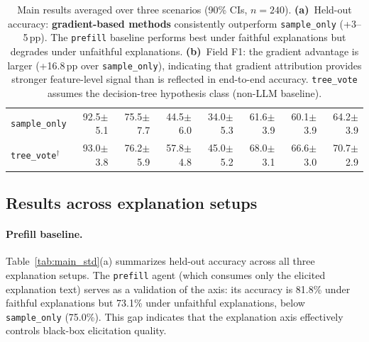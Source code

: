 \documentclass{article} %
\begin{document}
\begin{table}[t]
\begin{center}
\begin{tabular}{@{}l rrrr r | r | r@{}}
\texttt{sample\_only} & 92.5{\scriptsize$\pm$5.1} & 75.5{\scriptsize$\pm$7.7} & 44.5{\scriptsize$\pm$6.0} & 34.0{\scriptsize$\pm$5.3} & 61.6{\scriptsize$\pm$3.9} & 60.1{\scriptsize$\pm$3.9} & 64.2{\scriptsize$\pm$3.9} \\[2pt]
\texttt{tree\_vote}$^\dagger$ & 93.0{\scriptsize$\pm$3.8} & 76.2{\scriptsize$\pm$5.9} & 57.8{\scriptsize$\pm$4.8} & 45.0{\scriptsize$\pm$5.2} & 68.0{\scriptsize$\pm$3.1} & 66.6{\scriptsize$\pm$3.0} & 70.7{\scriptsize$\pm$2.9} \\
\bottomrule
\end{tabular}
\renewcommand{\arraystretch}{1.0}
\end{center}
\vspace{-0.1in}
\caption{Main results averaged over three scenarios (90\% CIs, $n{=}240$). \textbf{(a)}~Held-out accuracy: {\setlength{\fboxsep}{1pt}\colorbox{gradrow}{\textbf{gradient-based methods}}} consistently outperform \texttt{sample\_only} (+3--5\,pp).
The \texttt{prefill} baseline performs best under faithful explanations but degrades under unfaithful explanations. \textbf{(b)}~Field F1: the gradient advantage is larger (+16.8\,pp over \texttt{sample\_only}), indicating that gradient attribution provides stronger feature-level signal than is reflected in end-to-end accuracy. \smash{$^\dagger$}\texttt{tree\_vote} assumes the decision-tree hypothesis class (non-LLM baseline).}
\label{tab:main_std}
\label{tab:f1}
\end{table}

\subsection{Results across explanation setups}
\label{sec:explanation_results}

\paragraph{Prefill baseline.}
Table~\ref{tab:main_std}(a) summarizes held-out accuracy across all three explanation setups.
The \texttt{prefill} agent (which consumes only the elicited explanation text) serves as a validation of the axis: its accuracy is {81.8\%} under faithful explanations but {73.1\%} under unfaithful explanations, below \texttt{sample\_only} ({75.0\%}).
This gap indicates that the explanation axis effectively controls black-box elicitation quality.
\end{document}
